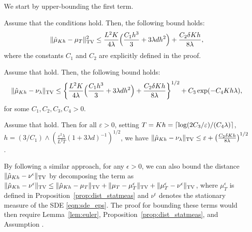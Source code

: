We start by upper-bounding the first term. 
%
\begin{lemma}
\label{lem:euler}
Assume that the conditions  hold. Then, the following bound holds:
\begin{align}
\| \hat{\mu}_{Kh} - \mu_{T} \|_{\textnormal{TV}}^2 \leq \frac{L^2 K}{4\lambda} \Bigl( \frac{C_1 h^3}{3} + 3 \lambda d h^2 \Bigr) + \frac{C_2 \delta K h}{8\lambda},
\end{align}
where the constants $C_1$ and $C_2$ are explicitly defined in the proof. 
\end{lemma}


\begin{thm}
\label{thm:euler}
Assume that  hold. Then, the following bound holds:
\begin{align}
\| \hat{\mu}_{Kh} - \nu_\lambda \|_{\textnormal{TV}} \leq \left \lbrace  \frac{L^2 K}{4\lambda} \Bigl( \frac{C_1 h^3}{3} + 3 \lambda d h^2 \Bigr) + \frac{C_2  \delta K h}{8\lambda} \right \rbrace^{1/2} +  C_3 \exp(-C_4 Kh \lambda),
\end{align}
for some $C_1,C_2,C_3,C_4 > 0$.
\end{thm}

\begin{cor}
  \label{coro:precision}
  Assume that  hold. Then for all $\varepsilon >0$, setting
$T = Kh  = \left\lceil \log(2C_3/\varepsilon)/(C_4\lambda) \right\rceil$, %
$h = (3/C_1)\wedge\left(\frac{\varepsilon^2 \lambda}{L^2 T}(1+3\lambda d)^{-1}\right)^{1/2}$, %
  we have
    $\| \hat{\mu}_{Kh} - \nu_\lambda \|_{\textnormal{TV}} \leq \varepsilon + \left(\frac{C_2 \delta K h}{8\lambda}\right)^{1/2} $. 
\end{cor}

\begin{remark}
By following a similar approach, for any $\epsilon > 0$, we can also bound the distance $\|\hat{\mu}_{Kh} - \nu^\epsilon\|_{\textnormal{TV}}$ by decomposing the term as $\|\hat{\mu}_{Kh} - \nu^\epsilon\|_{\textnormal{TV}} \leq \|\hat{\mu}_{Kh} - \mu_T\|_{\textnormal{TV}} + \| \mu_T - \mu_T^\epsilon\|_{\textnormal{TV}} + \|\mu_T^\epsilon - \nu^\epsilon \|_{\textnormal{TV}}$, where $\mu_T^\epsilon$ is defined in Proposition~\ref{prop:dist_statmeas} and $\nu^\epsilon$ denotes the stationary measure of the SDE \eqref{eqn:sde_eps}. The proof for bounding these terms would then require Lemma~\ref{lem:euler}, Proposition~\ref{prop:dist_statmeas}, and Assumption . %
\end{remark} 